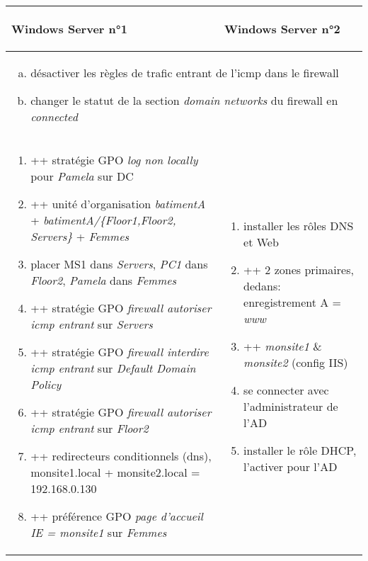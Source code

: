 \documentclass[a4paper]{article}
\begin{document}
\begin{center}
    \begin{tabular}{|p{7.5cm}|p{7.5cm}|} \hline

        \begin{center} \textbf{Windows Server n°1} \end{center} &
        \begin{center} \textbf{Windows Server n°2} \end{center} \\ \hline

        \multicolumn{2}{|p{15cm}|}{
            \begin{enumerate}[(a)]
                \item désactiver les règles de trafic entrant de l'icmp dans le firewall
                \item changer le statut de la section \textit{domain networks} du firewall en \textit{connected}
            \end{enumerate}
        }

        \\ \hline

        \begin{enumerate}
            \item ++ stratégie GPO \textit{log non locally} pour \textit{Pamela} sur DC
            \item ++ unité d'organisation \textit{batimentA} + \textit{batimentA/\{Floor1,Floor2, Servers\}} + \textit{Femmes}
            \item placer MS1 dans \textit{Servers}, \textit{PC1} dans \textit{Floor2}, \textit{Pamela} dans \textit{Femmes}
            \item ++ stratégie GPO \textit{firewall autoriser icmp entrant} sur \textit{Servers}
            \item ++ stratégie GPO \textit{firewall interdire icmp entrant} sur \textit{Default Domain Policy}
            \item ++ stratégie GPO \textit{firewall autoriser icmp entrant} sur \textit{Floor2}
            \item ++ redirecteurs conditionnels (dns), monsite1.local + monsite2.local = 192.168.0.130
            \item ++ préférence GPO \textit{page d'accueil IE = monsite1} sur \textit{Femmes}
        \end{enumerate}
        &
        \begin{enumerate}
            \item installer les rôles DNS et Web
            \item ++ 2 zones primaires, dedans: enregistrement A = \textit{www}
            \item ++ \textit{monsite1} \& \textit{monsite2} (config IIS)
            \item se connecter avec l'administrateur de l'AD
            \item installer le rôle DHCP, l'activer pour l'AD
        \end{enumerate}


\end{tabular}
\end{center}
\end{document}
